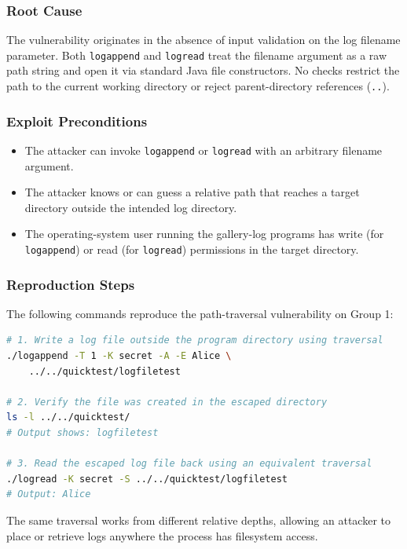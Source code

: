\documentclass[a4paper, 12pt]{article}
\begin{document}
    \subsubsection{Root Cause}
    The vulnerability originates in the absence of input validation on the log filename parameter. Both \texttt{logappend} and \texttt{logread} treat the filename argument as a raw path string and open it via standard Java file constructors. No checks restrict the path to the current working directory or reject parent-directory references (\texttt{..}).

    \subsubsection{Exploit Preconditions}
    \begin{itemize}
        \item The attacker can invoke \texttt{logappend} or \texttt{logread} with an arbitrary filename argument.
        \item The attacker knows or can guess a relative path that reaches a target directory outside the intended log directory.
        \item The operating-system user running the gallery-log programs has write (for \texttt{logappend}) or read (for \texttt{logread}) permissions in the target directory.
    \end{itemize}

    \subsubsection{Reproduction Steps}
    The following commands reproduce the path-traversal vulnerability on Group 1:

    \begin{lstlisting}[language=bash]
# 1. Write a log file outside the program directory using traversal
./logappend -T 1 -K secret -A -E Alice \
    ../../quicktest/logfiletest

# 2. Verify the file was created in the escaped directory
ls -l ../../quicktest/
# Output shows: logfiletest

# 3. Read the escaped log file back using an equivalent traversal
./logread -K secret -S ../../quicktest/logfiletest
# Output: Alice
    \end{lstlisting}

    The same traversal works from different relative depths, allowing an attacker to place or retrieve logs anywhere the process has filesystem access.
\end{document}
